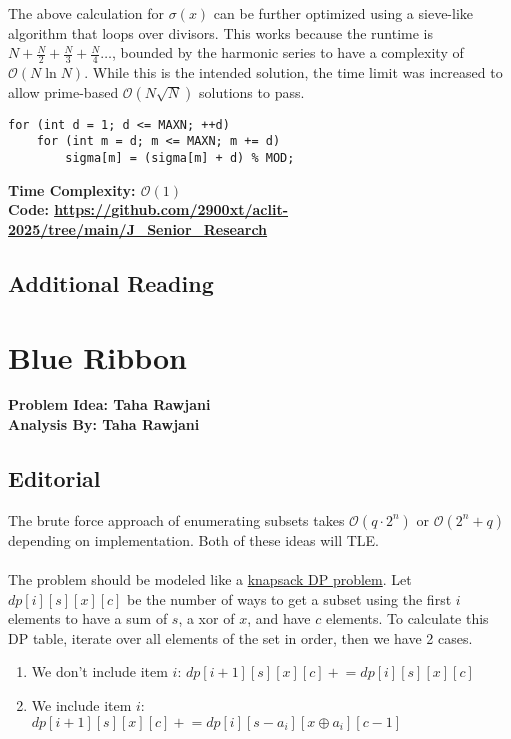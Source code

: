 \documentclass{article}
\newcommand{\link}[1]{\textcolor{blue!50!black}{\uline{\url{#1}}}}
\begin{document}
\\\\
The above calculation for $\sigma(x)$ can be further optimized using a sieve-like algorithm that loops over divisors. This works because the runtime is $N+\frac{N}{2}+\frac{N}{3}+\frac{N}{4}\dots$, bounded by the harmonic series to have a complexity of $\mathcal{O}(N\ln N)$. While this is the intended solution, the time limit was increased to allow prime-based $\mathcal{O}(N\sqrt{N})$ solutions to pass. 
\begin{lstlisting}
for (int d = 1; d <= MAXN; ++d) 
    for (int m = d; m <= MAXN; m += d) 
        sigma[m] = (sigma[m] + d) % MOD;
\end{lstlisting}
\textbf{Time Complexity: $\mathcal{O}(1)$}\\
\textbf{Code: \link{https://github.com/2900xt/aclit-2025/tree/main/J_Senior_Research}}
\subsection{Additional Reading}
\section{Blue Ribbon}
\textbf{Problem Idea: Taha Rawjani\\Analysis By: Taha Rawjani}
\subsection{Editorial}

The brute force approach of enumerating subsets takes $\mathcal{O}(q\cdot2^n)$ or $\mathcal{O}(2^n + q)$ depending on implementation. Both of these ideas will TLE.
\\\\
The problem should be modeled like a \href{https://usaco.guide/gold/knapsack}{knapsack DP problem}. Let $dp[i][s][x][c]$ be the number of ways to get a subset using the first $i$ elements to have a sum of $s$, a xor of $x$, and have $c$ elements. To calculate this DP table, iterate over all elements of the set in order, then we have 2 cases.
\begin{enumerate}
	\item We don't include item $i$: $dp[i+1][s][x][c] \mathrel{+}= dp[i][s][x][c]$ 
	\item We include item $i$: $dp[i+1][s][x][c] \mathrel{+}= dp[i][s-a_i][x \oplus a_i][c-1]$
\end{enumerate}
\end{document}
